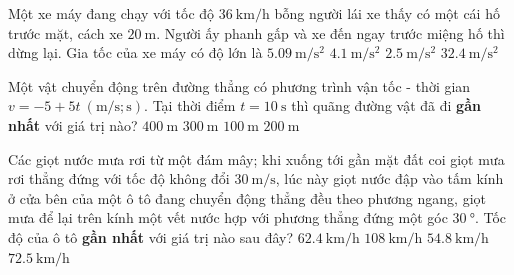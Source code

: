 \begin{ex}
	Một xe máy đang chạy với tốc độ $\SI{36}{\kilo\meter/\hour}$ bỗng người lái xe thấy có một cái hố trước mặt, cách xe $\SI{20}{\meter}$. Người ấy phanh gấp và xe đến ngay trước miệng hố thì dừng lại. Gia tốc của xe máy có độ lớn là 
	\choice
	{$\SI{5.09}{\meter/\second^2}$}
	{$\SI{4.1}{\meter/\second^2}$}
	{\True $\SI{2.5}{\meter/\second^2}$}
	{$\SI{32.4}{\meter/\second^2}$}
	\loigiai{}
\end{ex}

\begin{ex}
	Một vật chuyển động trên đường thẳng có phương trình vận tốc - thời gian $v=-5+5t\ \left(\si{\meter/\second};\si{\second}\right)$. Tại thời điểm $t=\SI{10}{\second}$ thì quãng đường vật đã đi \textbf{gần nhất} với giá trị nào?
	\choice
	{$\SI{400}{\meter}$}
	{$\SI{300}{\meter}$}
	{$\SI{100}{\meter}$}
	{\True $\SI{200}{\meter}$}
\end{ex}


\begin{ex}
Các giọt nước mưa rơi từ một đám mây; khi xuống tới gần mặt đất	coi giọt mưa rơi thẳng đứng với tốc độ không đổi $\SI{30}{\meter/\second}$, lúc này giọt nước đập vào tấm kính ở cửa bên của một ô tô đang chuyển động thẳng đều theo phương ngang, giọt mưa để lại trên kính một vết nước hợp với phương thẳng đứng một góc $\SI{30}{\degree}$. Tốc độ của ô tô \textbf{gần nhất} với giá trị nào sau đây?
	\choice
	{\True $\SI{62.4}{\kilo\meter/\hour}$}
	{$\SI{108}{\kilo\meter/\hour}$}
	{$\SI{54.8}{\kilo\meter/\hour}$}
	{$\SI{72.5}{\kilo\meter/\hour}$}
\end{ex}


